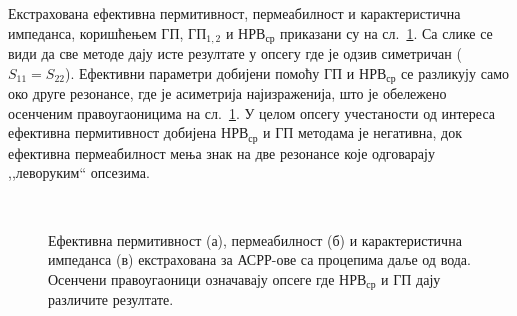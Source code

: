 Екстрахована ефективна пермитивност, пермеабилност и карактеристична импеданса, коришћењем $ГП$, $ГП_{1,2}$ и $НРВ_{ср}$ приказани су на сл.~\ref{fig10}. Са слике се види да све методе дају исте резултате у опсегу где је одзив симетричан ($S_{11} = S_{22}$). Ефективни параметри добијени помоћу ГП и $НРВ_{ср}$ се разликују само око друге резонансе, где је асиметрија најизраженија, што је обележено осенченим правоугаоницима на сл.~\ref{fig10}. У целом опсегу учестаности од интереса ефективна пермитивност добијена $НРВ_{ср}$ и ГП методама је негативна, док ефективна пермеабилност мења знак на две резонансе које одговарају ,,леворуким`` опсезима.
\begin{figure}[!t]
\centering
{}\hfill
{}\\
\caption{Ефективна пермитивност (а), пермеабилност (б) и карактеристична импеданса (в) екстрахована за АСРР-ове са процепима даље од вода. Осенчени правоугаоници означавају опсеге где $НРВ_{ср}$ и ГП дају различите резултате.}
\label{fig10}
\end{figure} 

